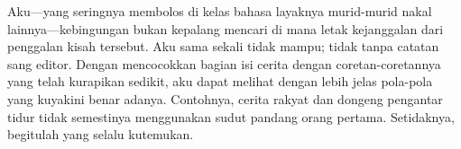 \documentclass[smalldemyvopaper,11pt,twoside,onecolumn,openright,extrafontsizes]{memoir}
\begin{document}

Aku---yang seringnya membolos di kelas bahasa layaknya murid-murid nakal lainnya---kebingungan bukan kepalang mencari di mana letak kejanggalan dari penggalan kisah tersebut. Aku sama sekali tidak mampu; tidak tanpa catatan sang editor. Dengan mencocokkan bagian isi cerita dengan coretan-coretannya yang telah kurapikan sedikit, aku dapat melihat dengan lebih jelas pola-pola yang kuyakini benar adanya. Contohnya, cerita rakyat dan dongeng pengantar tidur tidak semestinya menggunakan sudut pandang orang pertama. Setidaknya, begitulah yang selalu kutemukan.






\end{document}
